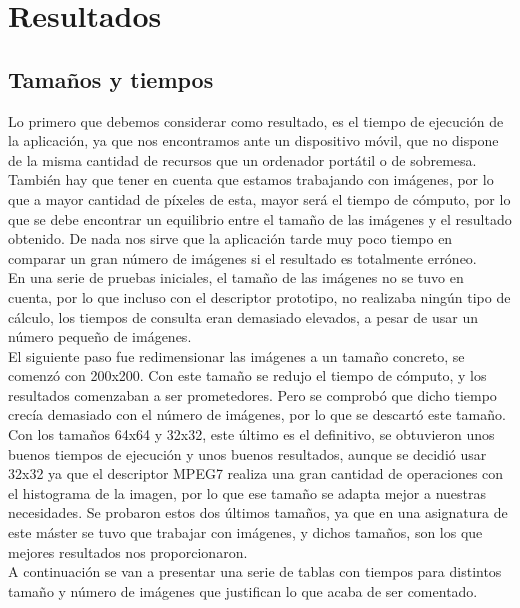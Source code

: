 \chapter{Resultados}
\label{cap:resultados}

\section{Tamaños y tiempos}
Lo primero que debemos considerar como resultado, es el tiempo de ejecución de la aplicación, ya que nos encontramos ante un dispositivo móvil, que no dispone de la misma cantidad de recursos que un ordenador portátil o de sobremesa.\\

También hay que tener en cuenta que estamos trabajando con imágenes, por lo que a mayor cantidad de píxeles de esta, mayor será el tiempo de cómputo, por lo que se debe encontrar un equilibrio entre el tamaño de las imágenes y el resultado obtenido. De nada nos sirve que la aplicación tarde muy poco tiempo en comparar un gran número de imágenes si el resultado es totalmente erróneo.\\

En una serie de pruebas iniciales, el tamaño de las imágenes no se tuvo en cuenta, por lo que incluso con el descriptor prototipo, no realizaba ningún tipo de cálculo, los tiempos de consulta eran demasiado elevados, a pesar de usar un número pequeño de imágenes.\\

El siguiente paso fue redimensionar las imágenes a un tamaño concreto, se comenzó con 200x200. Con este tamaño se redujo el tiempo de cómputo, y los resultados comenzaban a ser prometedores. Pero se comprobó que dicho tiempo crecía demasiado con el número de imágenes, por lo que se descartó este tamaño.\\

Con los tamaños 64x64 y 32x32, este último es el definitivo, se obtuvieron unos buenos tiempos de ejecución y unos buenos resultados, aunque se decidió usar 32x32 ya que el descriptor MPEG7 realiza una gran cantidad de operaciones con el histograma de la imagen, por lo que ese tamaño se adapta mejor a nuestras necesidades. Se probaron estos dos últimos tamaños, ya que en una asignatura de este máster se tuvo que trabajar con imágenes, y dichos tamaños, son los que mejores resultados nos proporcionaron.\\

A continuación se van a presentar una serie de tablas con tiempos para distintos tamaño y número de imágenes que justifican lo que acaba de ser comentado.\\


